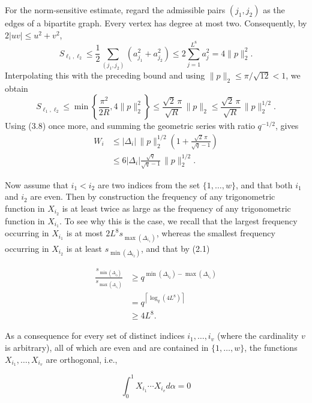 \documentclass[10pt]{article}
\newcommand{\1}{\mathbf{1}}
\begin{document}
For the norm-sensitive estimate, regard the admissible pairs $(j_1,j_2)$
as the edges of a bipartite graph.  Every vertex has degree at most two.
Consequently, by $2|uv|\leqslant u^2+v^2$,
\[
S_{\ell_1,\ell_2}
 \leqslant\frac12\sum_{(j_1,j_2)}(a_{j_1}^2+a_{j_2}^2)
 \leqslant2\sum_{j=1}^{L^8}a_j^2
 =4\|p\|_2^2.
\]
Interpolating this with the preceding bound and using
$\|p\|_2\leqslant\pi/\sqrt{12}<1$, we obtain
\[
S_{\ell_1,\ell_2}
 \leqslant\min\left\{\frac{\pi^2}{2R},4\|p\|_2^2\right\}
 \leqslant\frac{\sqrt2\,\pi}{\sqrt R}\,\|p\|_2
 \leqslant\frac{\sqrt2\,\pi}{\sqrt R}\,\|p\|_2^{1/2}.
\]
Using (3.8) once more, and summing the geometric series with ratio
$q^{-1/2}$, gives
\begin{align*}
W_i
&\leqslant |\Delta_i|\,\|p\|_2^{1/2}
 \left(1+\frac{\sqrt2\,\pi}{\sqrt q-1}\right)\\
&\leqslant6|\Delta_i|\frac{\sqrt q}{\sqrt q-1}\,\|p\|_2^{1/2}. \tag{3.10}
\end{align*}


Now assume that $i_{1}<i_{2}$ are two indices from the set $\{1, \ldots, w\}$, and that both $i_{1}$ and $i_{2}$ are even. Then by construction the frequency of any trigonometric function in $X_{i_{2}}$ is at least twice as large as the frequency of any trigonometric function in $X_{i_{1}}$. To see why this is the case, we recall that the largest frequency occurring in $X_{i_1}$ is at most $2L^8s_{\max(\Delta_{i_1})}$, whereas the smallest frequency occurring in $X_{i_2}$ is at least $s_{\min(\Delta_{i_2})}$, and that by (2.1)

$$
\begin{aligned}
\frac{s_{\min \left(\Delta_{i_{2}}\right)}}{s_{\max \left(\Delta_{i_{1}}\right)}} & \geqslant q^{\min \left(\Delta_{i_{2}}\right)-\max \left(\Delta_{i_{1}}\right)} \\
& =q^{\left\lceil\log _{q}\left(4 L^{8}\right)\right\rceil} \\
& \geqslant 4 L^{8} .
\end{aligned}
$$

As a consequence for every set of distinct indices $i_{1}, \ldots, i_{v}$ (where the cardinality $v$ is arbitrary), all of which are even and are contained in $\{1, \ldots, w\}$, the functions $X_{i_{1}}, \ldots, X_{i_{v}}$ are orthogonal, i.e.,


\begin{equation*}
\int_{0}^{1} X_{i_{1}} \cdots X_{i_{v}} d \alpha=0 \tag{3.11}
\end{equation*}
\end{document}
